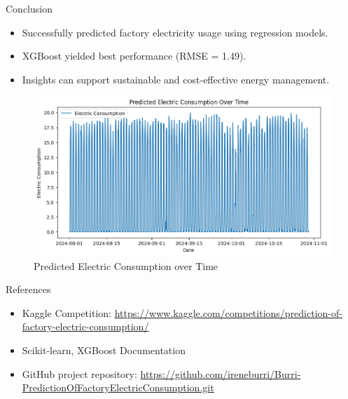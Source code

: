 \documentclass{beamer}
\begin{document}
\begin{frame}{Conclusion}
  \begin{itemize}
    \item Successfully predicted factory electricity usage using regression models.
    \item XGBoost yielded best performance (RMSE = 1.49).
    \item Insights can support sustainable and cost-effective energy management.
  \end{itemize}
    \begin{figure}
\vfill
    \centering
    \includegraphics[width=0.5\linewidth]{images/predictedEC.png}
    \caption{Predicted Electric Consumption over Time}
    \label{fig:enter-label}
\end{figure}
\end{frame}

\begin{frame}{References}
  \begin{itemize}
    \item Kaggle Competition: \url{https://www.kaggle.com/competitions/prediction-of-factory-electric-consumption/}
    \item Scikit-learn, XGBoost Documentation
    \item GitHub project repository: \url{https://github.com/ireneburri/Burri-PredictionOfFactoryElectricConsumption.git}
  \end{itemize}
\end{frame}
\end{document}
